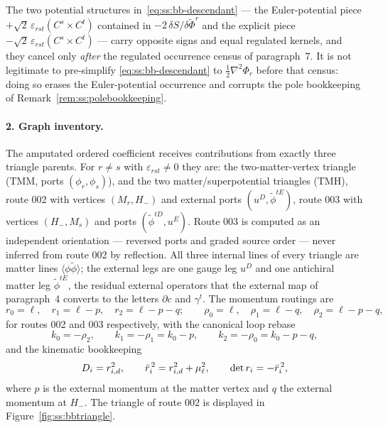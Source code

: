 \begin{remark}%
\label{rem:ss:bbnopresimplify}
The two potential structures in~\eqref{eq:ss:bb-descendant} --- the
Euler-potential piece $+\sqrt2\,\varepsilon_{rst}(C^s\times C^t)$ contained in
$-2\,\delta S/\delta\widetilde\Phi^r$ and the explicit piece
$-\sqrt2\,\varepsilon_{rst}(C^s\times C^t)$ --- carry opposite signs and equal
regulated kernels, and they cancel only \emph{after} the regulated occurrence
census of paragraph~7. It is not legitimate to pre-simplify
\eqref{eq:ss:bb-descendant} to $\tfrac12\nabla^2\Phi_r$ before that census:
doing so erases the Euler-potential occurrence and corrupts the pole
bookkeeping of Remark~\ref{rem:ss:polebookkeeping}.
\end{remark}

\paragraph{2. Graph inventory.} The amputated ordered coefficient receives
contributions from exactly three triangle parents. For $r\ne s$ with
$\varepsilon_{rst}\ne0$ they are: the two-matter-vertex triangle (TMM, ports
$(\phi_r,\phi_s)$), and the two matter/superpotential triangles (TMH), route
002 with vertices $(M_r,H_-)$ and external ports $(u^D,\widetilde\phi^{tE})$,
route 003 with vertices $(H_-,M_s)$ and ports $(\widetilde\phi^{tD},u^E)$.
Route 003 is computed as an independent orientation --- reversed ports and
graded source order --- never inferred from route 002 by reflection. All three
internal lines of every triangle are matter lines
$\langle\phi\widetilde\phi\rangle$; the external legs are one gauge leg $u^D$
and one antichiral matter leg $\widetilde\phi^{tE}$, the residual external
operators that the external map of paragraph~4 converts to the letters
$\partial c$ and $\gamma^t$. The momentum routings are
\begin{equation}\label{eq:ss:bb-routing}
r_0=\ell,\quad r_1=\ell-p,\quad r_2=\ell-p-q;
\qquad
\rho_0=\ell,\quad \rho_1=\ell-q,\quad \rho_2=\ell-p-q,
\end{equation}
for routes 002 and 003 respectively, with the canonical loop rebase
\begin{equation}\label{eq:ss:bb-rebase}
k_0=-\rho_2,\qquad k_1=-\rho_1=k_0-p,\qquad k_2=-\rho_0=k_0-p-q,
\end{equation}
and the kinematic bookkeeping
\begin{equation}\label{eq:ss:bb-kinematics}
D_i=r_{i,d}^{2},\qquad \bar r_i^{\,2}=r_{i,d}^{2}+\mu_\ell^{2},\qquad \det r_i=-\bar r_i^{\,2},
\end{equation}
where $p$ is the external momentum at the matter vertex and $q$ the external
momentum at $H_-$. The triangle of route 002 is displayed in
Figure~\ref{fig:ss:bbtriangle}.

